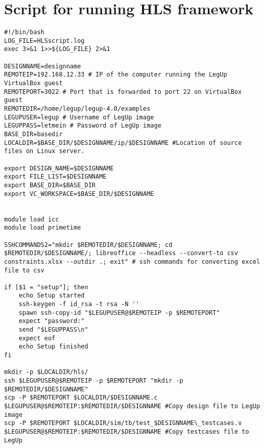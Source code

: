 \section{\label{sec:hlsscriptsourcecode}Script for running HLS framework}
\lstset{language=[gnu] make, style=Cstyle}
\begin{lstlisting}[caption={HLS Script source code},label=lst:hlsscriptsourcecode]
#!/bin/bash
LOG_FILE=HLSscript.log
exec 3>&1 1>>${LOG_FILE} 2>&1

DESIGNNAME=designname
REMOTEIP=192.168.12.33 # IP of the computer running the LegUp VirtualBox guest
REMOTEPORT=3022 # Port that is forwarded to port 22 on VirtualBox guest
REMOTEDIR=/home/legup/legup-4.0/examples
LEGUPUSER=legup # Username of LegUp image
LEGUPPASS=letmein # Password of LegUp image
BASE_DIR=basedir
LOCALDIR=$BASE_DIR/$DESIGNNAME/ip/$DESIGNNAME #Location of source files on Linux server.

export DESIGN_NAME=$DESIGNNAME
export FILE_LIST=$DESIGNNAME
export BASE_DIR=$BASE_DIR
export VC_WORKSPACE=$BASE_DIR/$DESIGNNAME


module load icc
module load primetime

SSHCOMMANDS2="mkdir $REMOTEDIR/$DESIGNNAME; cd $REMOTEDIR/$DESIGNNAME/; libreoffice --headless --convert-to csv constraints.xlsx --outdir .; exit" # ssh commands for converting excel file to csv

if [$1 = "setup"]; then
	echo Setup started
	ssh-keygen -f id_rsa -t rsa -N ''
	spawn ssh-copy-id "$LEGUPUSER@$REMOTEIP -p $REMOTEPORT"
	expect "password:"
	send "$LEGUPPASS\n"
	expect eof
	echo Setup finished
fi

mkdir -p $LOCALDIR/hls/
ssh $LEGUPUSER@$REMOTEIP -p $REMOTEPORT "mkdir -p $REMOTEDIR/$DESIGNNAME"
scp -P $REMOTEPORT $LOCALDIR/$DESIGNNAME.c $LEGUPUSER@$REMOTEIP:$REMOTEDIR/$DESIGNNAME #Copy design file to LegUp image
scp -P $REMOTEPORT $LOCALDIR/sim/tb/test_$DESIGNNAME\_testcases.v $LEGUPUSER@$REMOTEIP:$REMOTEDIR/$DESIGNNAME #Copy testcases file to LegUp


\end{lstlisting}

